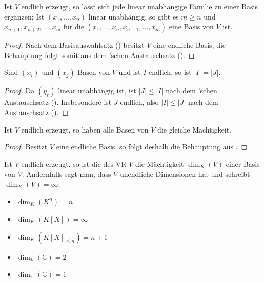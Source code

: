 \begin{conclusion}
	Ist $V$ endlich erzeugt, so lässt sich jede linear unabhängige Familie zu einer Basis ergänzen: 
	Ist $(x_1,...,x_n)$ linear unabhängig, so gibt es $m\ge n$ und $x_{n+1},x_{n+2},...,x_m$ für die $(x_1,...,x_n,
	x_{n+1},...,x_m)$ eine Basis von $V$ ist.
\end{conclusion}
\begin{proof}
	Nach dem Basisauswahlsatz () besitzt $V$ eine endliche Basis, die Behauptung folgt somit aus dem 'schen Austauschsatz ().
\end{proof}

\begin{conclusion}
	Sind $(x_i)$ und $(x_j)$ Basen von $V$ und ist $I$ endlich, so ist $|I|=|J|$.
\end{conclusion}
\begin{proof}
	Da $(y_r)$ linear unabhängig ist, ist $|J|\le |I|$ nach dem 'schen Austauschsatz (). Insbesondere ist $J$ 
	endlich, also $|I|\le |J|$ nach dem Austauschsatz ().
\end{proof}

\begin{conclusion}
	Ist $V$ endlich erzeugt, so haben alle Basen von $V$ die gleiche Mächtigkeit.
\end{conclusion}
\begin{proof}
	Besitzt $V$ eine endliche Basis, so folgt deshalb die Behauptung aus .
\end{proof}

\begin{definition}[Dimension]
	Ist $V$ endlich erzeugt, so ist die  des VR $V$ die Mächtigkeit $\dim_K(V)$ 
	einer Basis von $V$. Andernfalls sagt man, dass $V$ unendliche Dimensionen hat und schreibt $\dim_K(V)= \infty$. 
\end{definition}

\begin{example}
	\begin{itemize}
		\item $\dim_K(K^n)=n$
		\item $\dim_K(K[X])=\infty$
		\item $\dim_K(K[X]_{\le n})=n+1$
		\item $\dim_{\mathbb R}(\mathbb C)=2$
		\item $\dim_{\mathbb C}(\mathbb C)=1$
	\end{itemize}
\end{example}

